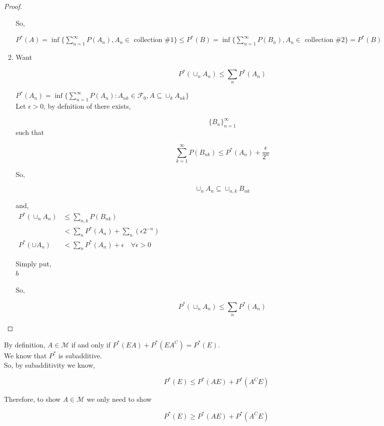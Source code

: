 \documentclass[11pt,fleqn]{book} %
\begin{document}
\begin{proof}
\begin{enumerate}[label = (\roman*)]
		So, 

		$P^*(A) = \inf\{\displaystyle \sum^\infty_{n=1} P(A_n), A_n \in  \text{ collection \#1}\} \leq P^*(B) = \inf\{\displaystyle \sum^\infty_{n=1} P(B_n), A_n \in  \text{ collection \#2}\} = P^*(B)$

		\item Want 

		$$P^*(\cup_n A_n) \leq \displaystyle\sum_n P^*(A_n) $$

		$P^*(A_n) = \inf \{\displaystyle \sum_{n=1}^\infty P(A_n): A_{nk} \in \mathscr{F}_0,  A \subseteq \cup_{k} A_{nk}\}$\\

		Let $\epsilon > 0$, by defnition of  there exists, 

		$$ \{B_n\}^\infty_{n=1}  $$ such that

		$$\displaystyle \sum^\infty_{k=1} P(B_{nk}) \leq P^*(A_n) + \frac{\epsilon}{2^n} $$

		So, 

		$$\cup_n A_n \subseteq \cup_{n,k} B_{nk} $$

		and,\\

		$\begin{aligned}
			P^*(\cup_n A_n) &\leq \displaystyle \sum_{n,k} P(B_{nk})\\ 
			&< \displaystyle \sum_n P^* (A_n) + \sum_n (\epsilon 2^{-n})\\
			P^*(\cup A_n) &< \sum_n P^* (A_n) + \epsilon \quad \forall \epsilon > 0
		\end{aligned}$

		Simply put, \\
		$ b$

		So, 

		$$P^*(\cup_n A_n) \leq \sum_n P^*(A_n) $$
 	\end{enumerate}
\end{proof}

By definition, $A \in \mathscr{M}$ if and only if $P^*(EA) + P^*(EA^C) = P^*(E)$. \\

We know that $P^*$ is subadditive. \\

So, by subadditivity we know, 

$$P^*(E) \leq P^*(AE) + P^*(A^C E) $$

Therefore, to show $A \in \mathscr{M}$ we only need to show 

$$P^*(E) \geq P^*(AE) + P^*(A^C E) $$
\end{document}

